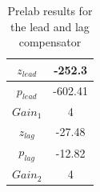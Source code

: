 \documentclass{article}
\begin{document}
\begin{table}[!htbp]
\centering
    \begin{tabular}{|c|c|}
        \hline
        $z_{lead}$ & -252.3 \\
        \hline
        $p_{lead}$ & -602.41 \\
        \hline
        $Gain_{1}$ & 4 \\
        \hline
        $z_{lag}$ & -27.48 \\
        \hline
        $p_{lag}$ & -12.82 \\
        \hline
        $Gain_{2}$ & 4 \\
        \hline
    \end{tabular}
    \caption{Prelab results for the lead and lag compensator}
\end{table}
\end{document}
